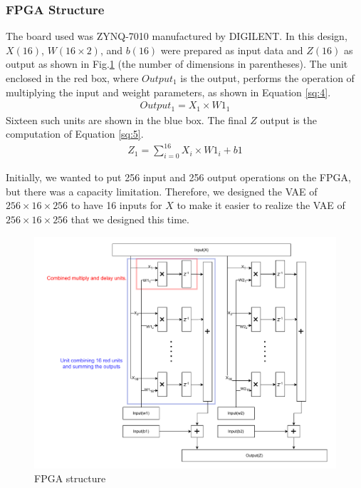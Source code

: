\documentclass[conference]{IEEEtran}
\begin{document}
\subsubsection{FPGA Structure}\label{2.2.4}
The board used was ZYNQ-7010 manufactured by DIGILENT.
In this design, $X(16)$, $W(16\times2)$, and $b(16)$ were prepared as input data and $Z(16)$ as output as shown in Fig.\ref{fig:2-2-3-1} (the number of dimensions in parentheses).
The unit enclosed in the red box, where $Output_1$ is the output, performs the operation of multiplying the input and weight parameters, as shown in Equation \ref{sq:4}.
\begin{align}
  Output_1 = X_1 \times W1_1 \label{sq:4}
\end{align}
Sixteen such units are shown in the blue box.
The final $Z$ output is the computation of Equation \ref{sq:5}.
\begin{align}
  Z_1 = \sum_{i = 0}^{16} X_i \times W1_i + b1 \label{sq:5}
\end{align}

Initially, we wanted to put 256 input and 256 output operations on the FPGA, but there was a capacity limitation.
Therefore, we designed the VAE of $256\times16\times256$ to have 16 inputs for $X$ to make it easier to realize the VAE of $256\times16\times256$ that we designed this time.

\begin{figure}[tb]
  \begin{center}
    \includegraphics[width=0.98\columnwidth]{figures/FPGA_1.pdf}
  \end{center}
  \caption{FPGA structure}
  \label{fig:2-2-3-1}
\end{figure}
\end{document}
